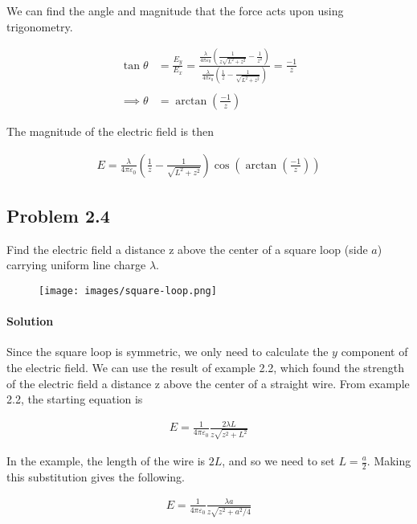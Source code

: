 \documentclass{article}
\begin{document}
We can find the angle and magnitude that the force acts upon using trigonometry. 

\begin{align*}
    \tan\theta &= \frac{E_y}{E_x} = \frac{\frac{\lambda}{4\pi\varepsilon_0} \left( \frac{1}{z\sqrt{L^2 + z^2}} - \frac{1}{z^2} \right)}{\frac{\lambda}{4\pi\varepsilon_0}\left( \frac{1}{z} - \frac{1}{\sqrt{L^2 + z^2}}\right)} = \frac{-1}{z} \\
    \\
    \implies \theta &= \arctan(\frac{-1}{z})
\end{align*}

The magnitude of the electric field is then 

\begin{align*}
    E = \frac{\lambda}{4\pi\varepsilon_0}\left( \frac{1}{z} - \frac{1}{\sqrt{L^2 + z^2}}\right)\cos(\arctan(\frac{-1}{z}))
\end{align*}


\newpage

\subsection*{Problem 2.4} Find the electric field a distance z above the center of a square loop (side $a$) carrying uniform line charge $\lambda$.

\begin{figure}[h]
    \centering
    \texttt{[image: images/square-loop.png]}
\end{figure}

\paragraph{Solution} Since the square loop is symmetric, we only need to calculate the $y$ component of the electric field. We can use the result of example 2.2, which found the strength of the electric field a distance z above the center of a straight wire.  From example 2.2, the starting equation is 

\begin{align*}
    E = \frac{1}{4\pi\varepsilon_0}{\frac{2\lambda L}{z\sqrt{z^2  + L^2}}}
\end{align*}

In the example, the length of the wire is $2L$, and so we need to set $L = \frac{a}{2}$. Making this substitution gives the following.

\begin{align*}
    E = \frac{1}{4\pi\varepsilon_0}{\frac{\lambda a}{z\sqrt{z^2  + a^2/4}}}
\end{align*}
\end{document}
